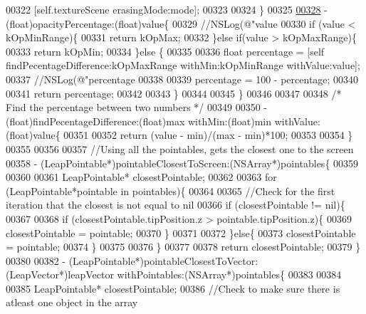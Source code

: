 \begin{DoxyCode}
{{00322     [\textcolor{keyword}{self}.textureScene erasingMode:mode];
00323     
00324 \}
00325 
\hypertarget{_game_manager_8mm_source_l00328}{}\hyperlink{interface_game_manager_a0acb835edfa002c4c66a92d02376bd0b}{00328} - (float)opacityPercentage:(\textcolor{keywordtype}{float})value\{
00329     \textcolor{comment}{//NSLog(@"value %
00330     \textcolor{keywordflow}{if} (value < kOpMinRange)\{
00331         \textcolor{keywordflow}{return} kOpMax;
00332     \}\textcolor{keywordflow}{else} \textcolor{keywordflow}{if}(value > kOpMaxRange)\{
00333         \textcolor{keywordflow}{return} kOpMin;
00334     \}\textcolor{keywordflow}{else} \{
00335         
00336         \textcolor{keywordtype}{float} percentage = [\textcolor{keyword}{self} findPecentageDifference:kOpMaxRange withMin:kOpMinRange withValue:value];
00337         \textcolor{comment}{//NSLog(@"percentage %
00338         
00339         percentage = 100 - percentage;
00340         
00341         \textcolor{keywordflow}{return} percentage;
00342         
00343     \}
00344 
00345 \}
00346 
00347 
00348 \textcolor{comment}{/* Find the percentage between two numbers */}
00349 
00350 - (float)findPecentageDifference:(\textcolor{keywordtype}{float})max withMin:(\textcolor{keywordtype}{float})min withValue:(\textcolor{keywordtype}{float})value\{
00351     
00352     \textcolor{keywordflow}{return} (value - min)/(max - min)*100;
00353 
00354 \}
00355 
00356 
00357 \textcolor{comment}{//Using all the pointables, gets the closest one to the screen}
00358 - (LeapPointable*)pointableClosestToScreen:(NSArray*)pointables\{
00359     
00360 
00361     LeapPointable* closestPointable;
00362     
00363     \textcolor{keywordflow}{for} (LeapPointable*pointable in pointables)\{
00364         
00365         \textcolor{comment}{//Check for the first iteration that the closest is not equal to nil}
00366         \textcolor{keywordflow}{if} (closestPointable != nil)\{
00367             
00368             \textcolor{keywordflow}{if} (closestPointable.tipPosition.z > pointable.tipPosition.z)\{
00369                 closestPointable = pointable;
00370             \}
00371             
00372         \}\textcolor{keywordflow}{else}\{
00373             closestPointable = pointable;
00374         \}
00375         
00376     \}
00377 
00378     \textcolor{keywordflow}{return} closestPointable;
00379 \}
00380 
00382 - (LeapPointable*)pointableClosestToVector:(LeapVector*)leapVector withPointables:(NSArray*)pointables\{
00383     
00384     
00385     LeapPointable* closestPointable;
00386     \textcolor{comment}{//Check to make sure there is atleast one object in the array}
}}}}
\end{DoxyCode}
